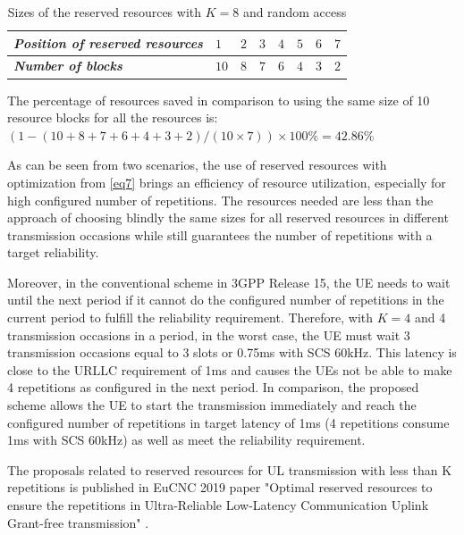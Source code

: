\documentclass{report}
\begin{document}
\begin{table}[htbp]
\caption{Sizes of the reserved resources with $K=8$ and random access}
\begin{center}
\begin{tabular}{|p{5em}|p{2em}|p{2em}|p{2em}|p{2em}|p{2em}|p{2em}|p{2em}|}
 \hline
 \textbf{\textit{Position of reserved resources}} & $1$ &$2$ &$3$ & $4$ &$5$ &$6$ &$7$\\ 
 \hline
 \textbf{\textit{Number of blocks}} & $10$ &$8$ &$7$ & $6$ &$4$ &$3$ &$2$\\

 
 \hline
\end{tabular}
\label{tab7}
\end{center}
\end{table}

The percentage of resources saved in comparison to using the same size of 10 resource blocks for all the resources is: $(1 - (10+8+7+6+4+3+2)/(10\times7)) \times100\% = 42.86\%$

As can be seen from two scenarios, the use of reserved resources with optimization from \eqref{eq7} brings an efficiency of resource utilization, especially for high configured number of repetitions. The resources needed are less than the approach of choosing blindly the same sizes for all reserved resources in different transmission occasions while still guarantees the number of repetitions with a target reliability.

Moreover, in the conventional scheme in 3GPP Release 15, the UE needs to wait until the next period if it cannot do the configured number of repetitions in the current period to fulfill the reliability requirement. Therefore, with $K=4$ and 4 transmission occasions in a period, in the worst case, the UE must wait 3 transmission occasions equal to 3 slots or 0.75ms with SCS 60kHz. This latency is close to the URLLC requirement of 1ms and causes the UEs not be able to make 4 repetitions as configured in the next period. In comparison, the proposed scheme allows the UE to start the transmission immediately and reach the configured number of repetitions in target latency of 1ms (4 repetitions consume 1ms with SCS 60kHz) as well as meet the reliability requirement.

The proposals related to reserved resources for UL transmission with less than K repetitions is published in EuCNC 2019 paper "Optimal reserved resources to ensure the repetitions in Ultra-Reliable Low-Latency Communication Uplink Grant-free transmission" \cite{b9}. 
\end{document}
